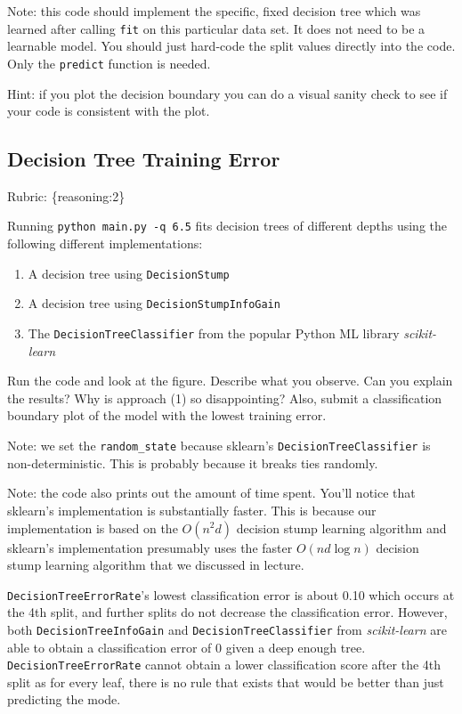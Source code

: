 \documentclass{article}
\def\rubric#1{\gre{Rubric: \{#1\}}}{}
\def\blu#1{{\color{blu}#1}}
\def\gre#1{{\color{gre}#1}}
\def\enum#1{\begin{enumerate}#1\end{enumerate}}
\begin{document}
Note: this code should implement the specific, fixed decision tree
which was learned after calling \texttt{fit} on this particular data set. It does not need to be a learnable model.
You should just hard-code the split values directly into the code. Only the \texttt{predict} function is needed.

Hint: if you plot the decision boundary you can do a visual sanity check to see if your code is consistent with the plot.



\subsection{Decision Tree Training Error}
\rubric{reasoning:2}

Running \texttt{python main.py -q 6.5} fits decision trees of different depths using the following different implementations: 
\enum{
\item A decision tree using \texttt{DecisionStump}
\item A decision tree using \texttt{DecisionStumpInfoGain}
\item The \texttt{DecisionTreeClassifier} from the popular Python ML library \emph{scikit-learn}
}

Run the code and look at the figure.
\blu{Describe what you observe. Can you explain the results?} Why is approach (1) so disappointing? Also, \blu{submit a classification boundary plot of the model with the lowest training error}.

Note: we set the \verb|random_state| because sklearn's \texttt{DecisionTreeClassifier} is non-deterministic. This is probably
because it breaks ties randomly.

Note: the code also prints out the amount of time spent. You'll notice that sklearn's implementation is substantially faster. This is because
our implementation is based on the $O(n^2d)$ decision stump learning algorithm and sklearn's implementation presumably uses the faster $O(nd\log n)$
decision stump learning algorithm that we discussed in lecture.

\gre{\texttt{DecisionTreeErrorRate}'s lowest classification error is about 0.10 which occurs at the 4th split, and further splits do not decrease the classification error. However, both \texttt{DecisionTreeInfoGain} and \texttt{DecisionTreeClassifier} from \emph{scikit-learn} are able to obtain a classification error of 0 given a deep enough tree. \texttt{DecisionTreeErrorRate} cannot obtain a lower classification score after the 4th split as for every leaf, there is no rule that exists that would be better than just predicting the mode.}
\end{document}
